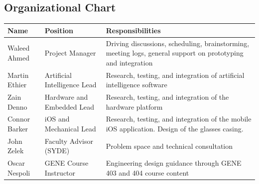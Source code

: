 \documentclass[a4paper,11pt]{article}
\begin{document}
\subsection{Organizational Chart}
\begin{table}[ht]
    \centering
    \begin{tabular}{|p{2.8cm}|p{5.5cm}|p{6.5cm}|}
        \hline
        Name & Position & Responsibilities \\ \hline
        Waleed Ahmed & Project Manager & Driving discussions, scheduling, brainstorming, meeting logs, general support on prototyping and integration
        \\ \hline
        
        Martin Ethier & Artificial Intelligence Lead & 
        Research, testing, and integration of artificial intelligence software
        \\ \hline
        
        Zain Denno & Hardware and Embedded Lead & 
        Research, testing, and integration of the hardware platform \\ \hline
        
        Connor Barker & iOS and Mechanical Lead & 
        Research, testing, and integration of the mobile iOS application. Design of the glasses casing. \\ \hline
        
        John Zelek & Faculty Advisor (SYDE) & Problem space and technical consultation \\ \hline
        
        Oscar Nespoli & GENE Course Instructor & Engineering design guidance through GENE 403 and 404 course content \\ \hline
    \end{tabular}
\end{table}
\end{document}
